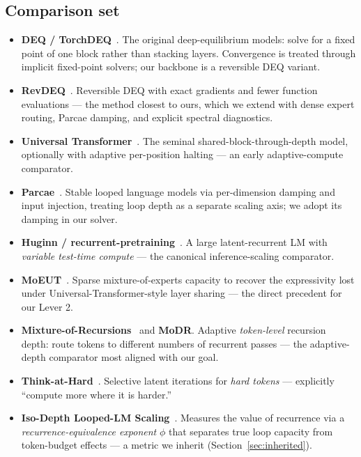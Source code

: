 \documentclass[11pt]{article}
\begin{document}
\subsection{Comparison set}
\label{sec:comparison-set}

\begin{itemize}[leftmargin=1.2em,itemsep=2pt]
  \item \textbf{DEQ / TorchDEQ}~\cite{deq,torchdeq}. The original deep-equilibrium
    models: solve for a fixed point of one block rather than stacking layers.
    Convergence is treated through implicit fixed-point solvers; our backbone is a
    reversible DEQ variant.
  \item \textbf{RevDEQ}~\cite{revdeq}. Reversible DEQ with exact gradients and
    fewer function evaluations --- the method closest to ours, which we extend with
    dense expert routing, Parcae damping, and explicit spectral diagnostics.
  \item \textbf{Universal Transformer}~\cite{ut}. The seminal shared-block-through-depth
    model, optionally with adaptive per-position halting --- an early adaptive-compute
    comparator.
  \item \textbf{Parcae}~\cite{parcae}. Stable looped language models via per-dimension
    damping and input injection, treating loop depth as a separate scaling axis; we
    adopt its damping in our solver.
  \item \textbf{Huginn / recurrent-pretraining}~\cite{huginn}. A large latent-recurrent
    LM with \emph{variable test-time compute} --- the canonical inference-scaling
    comparator.
  \item \textbf{MoEUT}~\cite{moeut}. Sparse mixture-of-experts capacity to recover the
    expressivity lost under Universal-Transformer-style layer sharing --- the direct
    precedent for our Lever 2.
  \item \textbf{Mixture-of-Recursions}~\cite{mor} and \textbf{MoDR}. Adaptive
    \emph{token-level} recursion depth: route tokens to different numbers of recurrent
    passes --- the adaptive-depth comparator most aligned with our goal.
  \item \textbf{Think-at-Hard}~\cite{tah}. Selective latent iterations for \emph{hard
    tokens} --- explicitly ``compute more where it is harder.''
  \item \textbf{Iso-Depth Looped-LM Scaling}~\cite{isodepth}. Measures the value of
    recurrence via a \emph{recurrence-equivalence exponent} $\phi$ that separates true
    loop capacity from token-budget effects --- a metric we inherit
    (Section~\ref{sec:inherited}).
\end{itemize}
\end{document}
